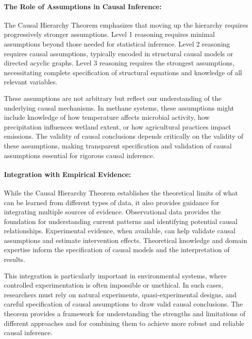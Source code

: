 \paragraph{The Role of Assumptions in Causal Inference:}

The Causal Hierarchy Theorem emphasizes that moving up the hierarchy requires progressively stronger assumptions. Level 1 reasoning requires minimal assumptions beyond those needed for statistical inference. Level 2 reasoning requires causal assumptions, typically encoded in structural causal models or directed acyclic graphs. Level 3 reasoning requires the strongest assumptions, necessitating complete specification of structural equations and knowledge of all relevant variables.

These assumptions are not arbitrary but reflect our understanding of the underlying causal mechanisms. In methane systems, these assumptions might include knowledge of how temperature affects microbial activity, how precipitation influences wetland extent, or how agricultural practices impact emissions. The validity of causal conclusions depends critically on the validity of these assumptions, making transparent specification and validation of causal assumptions essential for rigorous causal inference.

\paragraph{Integration with Empirical Evidence:}

While the Causal Hierarchy Theorem establishes the theoretical limits of what can be learned from different types of data, it also provides guidance for integrating multiple sources of evidence. Observational data provides the foundation for understanding current patterns and identifying potential causal relationships. Experimental evidence, when available, can help validate causal assumptions and estimate intervention effects. Theoretical knowledge and domain expertise inform the specification of causal models and the interpretation of results.

This integration is particularly important in environmental systems, where controlled experimentation is often impossible or unethical. In such cases, researchers must rely on natural experiments, quasi-experimental designs, and careful specification of causal assumptions to draw valid causal conclusions. The theorem provides a framework for understanding the strengths and limitations of different approaches and for combining them to achieve more robust and reliable causal inference.


